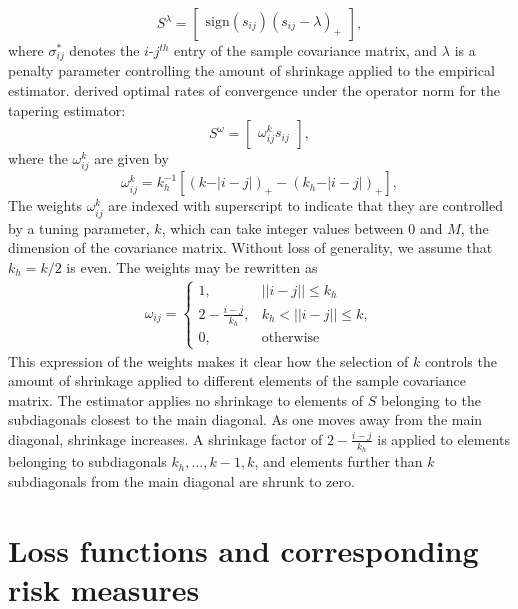 \documentclass[12pt]{article}
\theoremstyle{definition}
\begin{document}
\[
S^{\lambda}=   \begin{bmatrix} \mbox{sign}\left(s_{ij}\right) \left(s_{ij} - \lambda\right)_+ \end{bmatrix},
\]
\noindent 
where $\sigma^*_{ij}$ denotes the $i$-$j^{th}$ entry of the sample covariance matrix, and $\lambda$ is a penalty parameter controlling the amount of shrinkage applied to the empirical estimator. \citet{cai2010optimal} derived optimal rates of convergence under the operator norm for the tapering estimator:
\[
S^{\omega} =  \begin{bmatrix} \omega_{ij}^k s_{ij} \end{bmatrix},
\]
\noindent
where the $\omega_{ij}^k$ are given by 
\begin{equation*}
\omega^k_{ij} = k_h^{-1} \left[ \left( k - \vert i-j\vert\right)_+ - \left(k_h - \vert i-j\vert\right)_+ \right],
\end{equation*}
\noindent
The weights $\omega^k_{ij}$ are indexed with superscript to indicate that they  are controlled by a tuning parameter, $k$,  which can take integer values between 0 and $M$, the dimension of the covariance matrix.  Without loss of generality,  we assume that $k_h = k/2$ is even. The weights may be rewritten as
\begin{align*}
\omega_{ij} = \left\{\begin{array}{ll} 1, & \vert \vert i -j \vert \vert \le k_h \\
                             2 - \frac{i - j}{k_h}, & k_h < \vert \vert i -j \vert \vert \le k, \\
                             0, & \mbox{otherwise}  \end{array} \right.
\end{align*}
\noindent
This expression of the weights makes it clear how the selection of $k$ controls the amount of shrinkage applied to different elements of the sample covariance matrix. The estimator applies no shrinkage to elements of $S$ belonging to the subdiagonals closest to the main diagonal. As one moves away from the main diagonal, shrinkage increases. A shrinkage factor of $2 - \frac{i - j}{k_h}$ is applied to elements belonging to subdiagonals $k_h,\dots,k-1,k$, and elements further than $k$ subdiagonals from the main diagonal are shrunk to zero.   

\section{Loss functions and corresponding risk measures}
\end{document}

